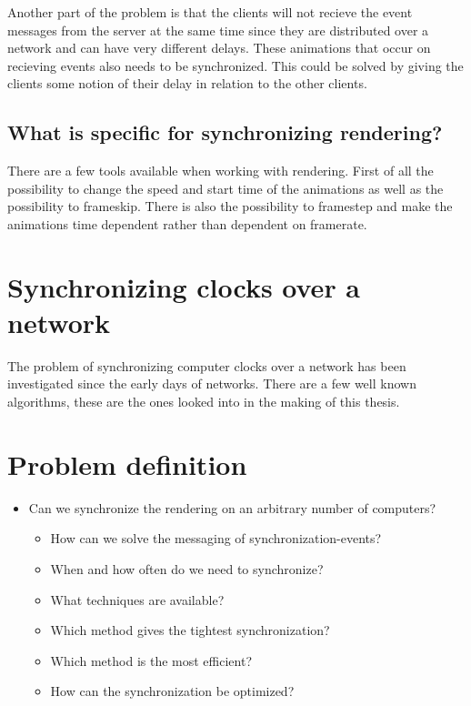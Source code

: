 Another part of the problem is that the clients will not recieve the event messages from the server at the same time since they are distributed over a network and can have very different delays. These animations that occur on recieving events also needs to be synchronized. This could be solved by giving the clients some notion of their delay in relation to the other clients. 

\subsection{What is specific for synchronizing rendering?}
There are a few tools available when working with rendering. First of all the possibility to change the speed and start time of the animations as well as the possibility to frameskip. There is also the possibility to framestep and make the animations time dependent rather than dependent on framerate.

\section{Synchronizing clocks over a network}
The problem of synchronizing computer clocks over a network has been investigated since the early days of networks. There are a few well known algorithms, these are the ones looked into in the making of this thesis. 





\section{Problem definition}
\label{sec:problem_definition}

\begin{itemize}
  \item Can we synchronize the rendering on an arbitrary number of computers?
  \begin{itemize}
    \item How can we solve the messaging of synchronization-events?
  	\item When and how often do we need to synchronize?
    \item What techniques are available?
    \item Which method gives the tightest synchronization? %
    \item Which method is the most efficient?
  	\item How can the synchronization be optimized?
  \end{itemize}
\end{itemize}
